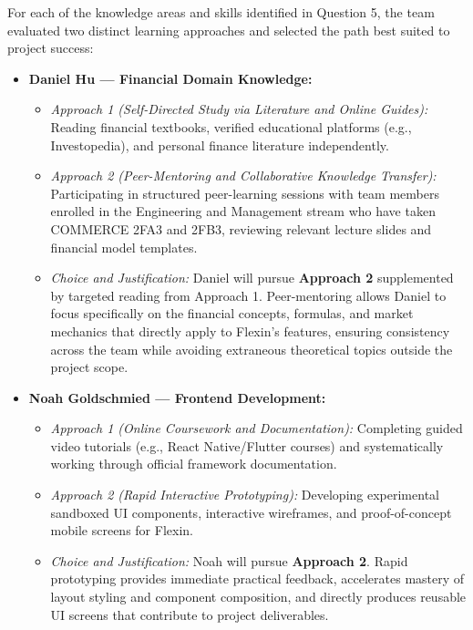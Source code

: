 \documentclass[12pt]{article}
\begin{document}
\begin{enumerate}
  For each of the knowledge areas and skills identified in Question 5, the team evaluated two distinct learning approaches and selected the path best suited to project success:
  \begin{itemize}
    \item \textbf{Daniel Hu --- Financial Domain Knowledge:}
    \begin{itemize}
      \item \textit{Approach 1 (Self-Directed Study via Literature and Online Guides):} Reading financial textbooks, verified educational platforms (e.g., Investopedia), and personal finance literature independently.
      \item \textit{Approach 2 (Peer-Mentoring and Collaborative Knowledge Transfer):} Participating in structured peer-learning sessions with team members enrolled in the Engineering and Management stream who have taken COMMERCE 2FA3 and 2FB3, reviewing relevant lecture slides and financial model templates.
      \item \textit{Choice and Justification:} Daniel will pursue \textbf{Approach 2} supplemented by targeted reading from Approach 1. Peer-mentoring allows Daniel to focus specifically on the financial concepts, formulas, and market mechanics that directly apply to Flexin's features, ensuring consistency across the team while avoiding extraneous theoretical topics outside the project scope.
    \end{itemize}

    \item \textbf{Noah Goldschmied --- Frontend Development:}
    \begin{itemize}
      \item \textit{Approach 1 (Online Coursework and Documentation):} Completing guided video tutorials (e.g., React Native/Flutter courses) and systematically working through official framework documentation.
      \item \textit{Approach 2 (Rapid Interactive Prototyping):} Developing experimental sandboxed UI components, interactive wireframes, and proof-of-concept mobile screens for Flexin.
      \item \textit{Choice and Justification:} Noah will pursue \textbf{Approach 2}. Rapid prototyping provides immediate practical feedback, accelerates mastery of layout styling and component composition, and directly produces reusable UI screens that contribute to project deliverables.
    \end{itemize}


\end{itemize}
\end{enumerate}
\end{document}
